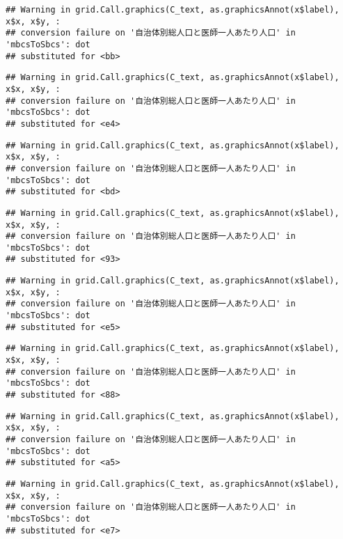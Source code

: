 \documentclass[
]{article}
\begin{document}
\begin{verbatim}
## Warning in grid.Call.graphics(C_text, as.graphicsAnnot(x$label), x$x, x$y, :
## conversion failure on '自治体別総人口と医師一人あたり人口' in 'mbcsToSbcs': dot
## substituted for <bb>
\end{verbatim}

\begin{verbatim}
## Warning in grid.Call.graphics(C_text, as.graphicsAnnot(x$label), x$x, x$y, :
## conversion failure on '自治体別総人口と医師一人あたり人口' in 'mbcsToSbcs': dot
## substituted for <e4>
\end{verbatim}

\begin{verbatim}
## Warning in grid.Call.graphics(C_text, as.graphicsAnnot(x$label), x$x, x$y, :
## conversion failure on '自治体別総人口と医師一人あたり人口' in 'mbcsToSbcs': dot
## substituted for <bd>
\end{verbatim}

\begin{verbatim}
## Warning in grid.Call.graphics(C_text, as.graphicsAnnot(x$label), x$x, x$y, :
## conversion failure on '自治体別総人口と医師一人あたり人口' in 'mbcsToSbcs': dot
## substituted for <93>
\end{verbatim}

\begin{verbatim}
## Warning in grid.Call.graphics(C_text, as.graphicsAnnot(x$label), x$x, x$y, :
## conversion failure on '自治体別総人口と医師一人あたり人口' in 'mbcsToSbcs': dot
## substituted for <e5>
\end{verbatim}

\begin{verbatim}
## Warning in grid.Call.graphics(C_text, as.graphicsAnnot(x$label), x$x, x$y, :
## conversion failure on '自治体別総人口と医師一人あたり人口' in 'mbcsToSbcs': dot
## substituted for <88>
\end{verbatim}

\begin{verbatim}
## Warning in grid.Call.graphics(C_text, as.graphicsAnnot(x$label), x$x, x$y, :
## conversion failure on '自治体別総人口と医師一人あたり人口' in 'mbcsToSbcs': dot
## substituted for <a5>
\end{verbatim}

\begin{verbatim}
## Warning in grid.Call.graphics(C_text, as.graphicsAnnot(x$label), x$x, x$y, :
## conversion failure on '自治体別総人口と医師一人あたり人口' in 'mbcsToSbcs': dot
## substituted for <e7>
\end{verbatim}
\end{document}
